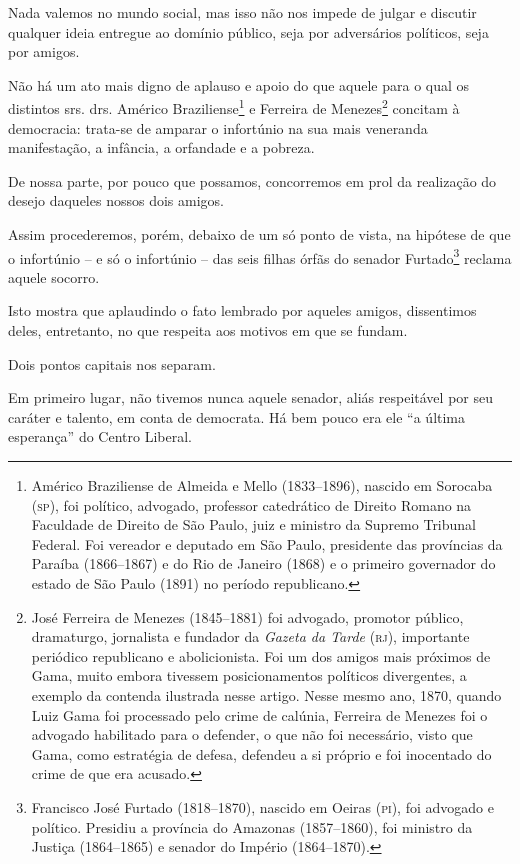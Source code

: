 Nada valemos no mundo social, mas isso não nos impede de julgar e
discutir qualquer ideia entregue ao domínio público, seja por
adversários políticos, seja por amigos.

Não há um ato mais digno de aplauso e apoio do que aquele para o qual os
distintos srs. drs. Américo Braziliense\footnote{ Américo Braziliense
  de Almeida e Mello (1833--1896), nascido em Sorocaba (\textsc{sp}), foi
  político, advogado, professor catedrático de Direito Romano na
  Faculdade de Direito de São Paulo, juiz e ministro da Supremo Tribunal
  Federal. Foi vereador e deputado em São Paulo, presidente das
  províncias da Paraíba (1866--1867) e do Rio de Janeiro (1868) e o
  primeiro governador do estado de São Paulo (1891) no período
  republicano.} e Ferreira de Menezes\footnote{ José Ferreira de
  Menezes (1845--1881) foi advogado, promotor público, dramaturgo,
  jornalista e fundador da \emph{Gazeta da Tarde} (\textsc{rj}), importante
  periódico republicano e abolicionista. Foi um dos amigos mais próximos
  de Gama, muito embora tivessem posicionamentos políticos divergentes,
  a exemplo da contenda ilustrada nesse artigo. Nesse mesmo ano, 1870,
  quando Luiz Gama foi processado pelo crime de calúnia, Ferreira de
  Menezes foi o advogado habilitado para o defender, o que não foi
  necessário, visto que Gama, como estratégia de defesa, defendeu a si
  próprio e foi inocentado do crime de que era acusado.} concitam à
democracia: trata-se de amparar o infortúnio na sua mais veneranda
manifestação, a infância, a orfandade e a pobreza.

De nossa parte, por pouco que possamos, concorremos em prol da
realização do desejo daqueles nossos dois amigos.

Assim procederemos, porém, debaixo de um só ponto de vista, na hipótese
de que o infortúnio -- e só o infortúnio -- das seis filhas órfãs do
senador Furtado\footnote{ Francisco José Furtado (1818--1870), nascido
  em Oeiras (\textsc{pi}), foi advogado e político. Presidiu a província do
  Amazonas (1857--1860), foi ministro da Justiça (1864--1865) e senador do
  Império (1864--1870).} reclama aquele socorro.

Isto mostra que aplaudindo o fato lembrado por aqueles amigos,
dissentimos deles, entretanto, no que respeita aos motivos em que se
fundam.

Dois pontos capitais nos separam.

Em primeiro lugar, não tivemos nunca aquele senador, aliás respeitável
por seu caráter e talento, em conta de democrata. Há bem pouco era ele
``a última esperança'' do Centro Liberal.


